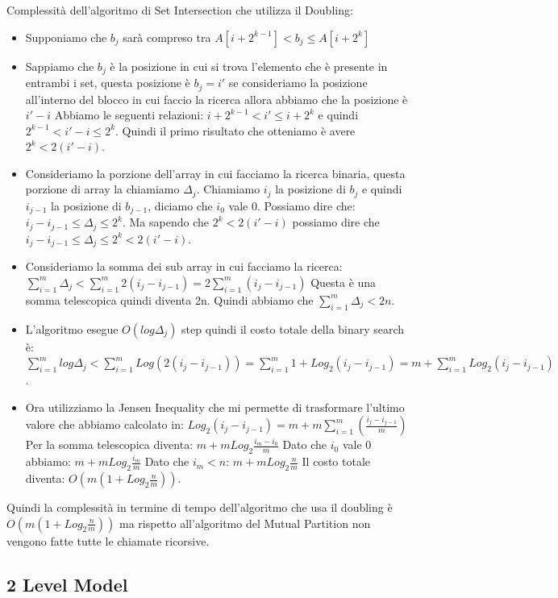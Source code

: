 \documentclass[14pt]{extreport}
\begin{document}
Complessità dell'algoritmo di Set Intersection che utilizza il Doubling:

\begin{itemize}
\item Supponiamo che $b_j$ sarà compreso tra $A[i+2^{k-1}] < b_j \leq A[i+2^k]$
\item Sappiamo che $b_j$ è la posizione in cui si trova l'elemento che è presente in entrambi i set, questa posizione è $b_j=i'$ se consideriamo la posizione all'interno del blocco in cui faccio la ricerca allora abbiamo che la posizione è $i'-i$
Abbiamo le seguenti relazioni:
$i+2^{k-1} < i' \leq i+2^k$ e quindi $2^{k-1} < i' - i \leq 2^k$. Quindi il primo risultato che otteniamo è avere $2^k < 2(i'-i)$.
\item Consideriamo la porzione dell'array in cui facciamo la ricerca binaria, questa porzione di array la chiamiamo $\Delta_j$. Chiamiamo $i_j$ la posizione di $b_j$ e quindi $i_{j-1}$ la posizione di $b_{j-1}$, diciamo che $i_0$ vale 0. Possiamo dire che: $i_j - i_{j-1} \leq \Delta_j \leq 2^k$. Ma sapendo che $2^k < 2(i'-i)$ possiamo dire che $i_j - i_{j-1} \leq \Delta_j \leq 2^k < 2(i'-i)$.
\item Consideriamo la somma dei sub array in cui facciamo la ricerca:
$\sum_{i=1}^m \Delta_j < \sum_{i=1}^m 2(i_j - i_{j-1}) = 2\sum_{i=1}^m (i_j - i_{j-1})$ Questa è una somma telescopica quindi diventa 2n. Quindi abbiamo che $\sum_{i=1}^m \Delta_j < 2n$.
\item L'algoritmo esegue $O(log\Delta_j)$ step quindi il costo totale della binary search è:
$\sum_{i=1}^m log\Delta_j < \sum_{i=1}^m Log(2(i_j-i_{j-1})) = \sum_{i=1}^m 1 + Log_2(i_j-i_{j-1}) = m + \sum_{i=1}^m Log_2(i_j-i_{j-1})$.
\item Ora utilizziamo la Jensen Inequality che mi permette di trasformare l'ultimo valore che abbiamo calcolato in:
$Log_2(i_j-i_{j-1}) = m + m\sum_{i=1}^m(\frac{i_j-i_{j-1}}{m})$ 
Per la somma telescopica diventa:
$m + m Log_2\frac{i_m - i_0}{m}$
Dato che $i_0$ vale 0 abbiamo:
$m + m Log_2\frac{i_m}{m}$
Dato che $i_m < n$:
$m + m Log_2\frac{n}{m}$
Il costo totale diventa: $O(m(1+Log_2 \frac{n}{m}))$.
\end{itemize}

Quindi la complessità in termine di tempo dell'algoritmo che usa il doubling è $O(m(1+Log_2 \frac{n}{m}))$ ma rispetto all'algoritmo del Mutual Partition non vengono fatte tutte le chiamate ricorsive.

\subsection{2 Level Model}
\end{document}
